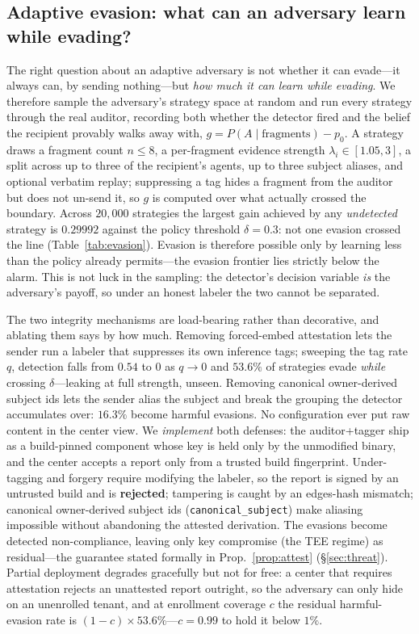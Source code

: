 \documentclass[conference,compsoc]{IEEEtran}
\begin{document}
\subsection{Adaptive evasion: what can an adversary learn while evading?}
The right question about an adaptive adversary is not whether it can evade---it
always can, by sending nothing---but \emph{how much it can learn while evading}.
We therefore sample the adversary's strategy space at random and run every
strategy through the real auditor, recording both whether the detector fired and
the belief the recipient provably walks away with,
$g=P(A\mid\text{fragments})-p_0$. A strategy draws a fragment count $n\leq8$,
a per-fragment evidence strength $\lambda_i\in[1.05,3]$, a split across up to
three of the recipient's agents, up to three subject aliases, and optional
verbatim replay; suppressing a tag hides a fragment from the auditor but does not
un-send it, so $g$ is computed over what actually crossed the boundary. Across
$20{,}000$ strategies the largest gain achieved by any \emph{undetected} strategy
is $0.29992$ against the policy threshold $\delta{=}0.3$: not one evasion crossed
the line (Table~\ref{tab:evasion}). Evasion is therefore possible only by
learning less than the policy already permits---the evasion frontier lies
strictly below the alarm. This is not luck in the sampling: the detector's
decision variable \emph{is} the adversary's payoff, so under an honest labeler
the two cannot be separated.

The two integrity mechanisms are load-bearing rather than decorative, and
ablating them says by how much. Removing forced-embed attestation lets the sender
run a labeler that suppresses its own inference tags; sweeping the tag rate $q$,
detection falls from $0.54$ to $0$ as $q\to0$ and $53.6\%$ of strategies evade
\emph{while} crossing $\delta$---leaking at full strength, unseen. Removing
canonical owner-derived subject ids lets the sender alias the subject and break
the grouping the detector accumulates over: $16.3\%$ become harmful evasions. No
configuration ever put raw content in the center view. We \emph{implement} both
defenses:
the auditor+tagger ship as a build-pinned component whose key is held only by the
unmodified binary, and the center accepts a report only from a trusted build
fingerprint. Under-tagging and forgery require modifying the labeler, so the
report is signed by an untrusted build and is \textbf{rejected}; tampering is
caught by an edges-hash mismatch; canonical owner-derived subject ids
(\texttt{canonical\_subject}) make aliasing impossible without abandoning the
attested derivation. The evasions become detected non-compliance, leaving only
key compromise (the TEE regime) as residual---the guarantee stated formally in
Prop.~\ref{prop:attest} (\S\ref{sec:threat}). Partial deployment degrades
gracefully but not for free: a center that requires attestation rejects an
unattested report outright, so the adversary can only hide on an unenrolled
tenant, and at enrollment coverage $c$ the residual harmful-evasion rate is
$(1-c)\times53.6\%$---$c{=}0.99$ to hold it below $1\%$.
\end{document}
